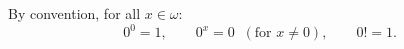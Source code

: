 By convention, for all $x\in\omega$:
$$0^0 = 1,\qquad 0^x = 0 \;\;(\text{for } x\neq 0),\qquad 0! = 1.$$
